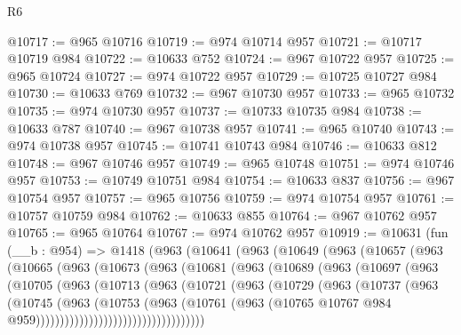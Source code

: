 \begin{lexlean}{R6}
\begin{coremodule}
@10717 := @965 @10716
@10719 := @974 @10714 @957
@10721 := @10717 @10719 @984
@10722 := @10633 @752
@10724 := @967 @10722 @957
@10725 := @965 @10724
@10727 := @974 @10722 @957
@10729 := @10725 @10727 @984
@10730 := @10633 @769
@10732 := @967 @10730 @957
@10733 := @965 @10732
@10735 := @974 @10730 @957
@10737 := @10733 @10735 @984
@10738 := @10633 @787
@10740 := @967 @10738 @957
@10741 := @965 @10740
@10743 := @974 @10738 @957
@10745 := @10741 @10743 @984
@10746 := @10633 @812
@10748 := @967 @10746 @957
@10749 := @965 @10748
@10751 := @974 @10746 @957
@10753 := @10749 @10751 @984
@10754 := @10633 @837
@10756 := @967 @10754 @957
@10757 := @965 @10756
@10759 := @974 @10754 @957
@10761 := @10757 @10759 @984
@10762 := @10633 @855
@10764 := @967 @10762 @957
@10765 := @965 @10764
@10767 := @974 @10762 @957
@10919 := @10631
    (fun (__b : @954) =>
    @1418
      (@963
        (@10641
          (@963
            (@10649
              (@963
                (@10657
                  (@963
                    (@10665
                      (@963
                        (@10673
                          (@963
                            (@10681
                              (@963
                                (@10689
                                  (@963
                                    (@10697
                                      (@963
                                        (@10705
                                          (@963
                                            (@10713
                                              (@963
                                                (@10721
                                                  (@963
                                                    (@10729
                                                      (@963
                                                        (@10737
                                                          (@963
                                                            (@10745
                                                              (@963
                                                                (@10753
                                                                  (@963
                                                                    (@10761
                                                                      (@963
                                                                        (@10765
                                                                          @10767
                                                                          @984
                                                                          @959)))))))))))))))))))))))))))))))))))

\end{coremodule}
\end{lexlean}
